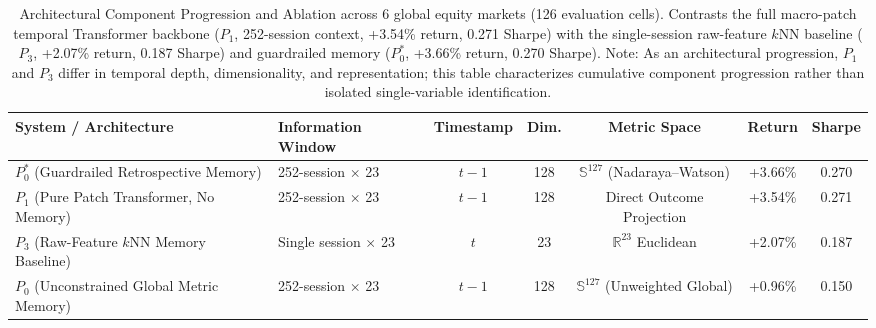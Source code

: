 \begin{table}[ht]
\centering
\small
\begin{tabular}{llccccc}
\toprule
\textbf{System / Architecture} & \textbf{Information Window} & \textbf{Timestamp} & \textbf{Dim.} & \textbf{Metric Space} & \textbf{Return} & \textbf{Sharpe} \\
\midrule
$P_0^*$ (Guardrailed Retrospective Memory) & 252-session $\times$ 23 & $t-1$ & 128 & $\mathbb{S}^{127}$ (Nadaraya--Watson) & +3.66\% & 0.270 \\
$P_1$ (Pure Patch Transformer, No Memory) & 252-session $\times$ 23 & $t-1$ & 128 & Direct Outcome Projection & +3.54\% & 0.271 \\
$P_3$ (Raw-Feature $k$NN Memory Baseline) & Single session $\times$ 23 & $t$ & 23 & $\mathbb{R}^{23}$ Euclidean & +2.07\% & 0.187 \\
$P_0$ (Unconstrained Global Metric Memory) & 252-session $\times$ 23 & $t-1$ & 128 & $\mathbb{S}^{127}$ (Unweighted Global) & +0.96\% & 0.150 \\
\bottomrule
\end{tabular}
\caption{Architectural Component Progression and Ablation across 6 global equity markets (126 evaluation cells). Contrasts the full macro-patch temporal Transformer backbone ($P_1$, 252-session context, +3.54\% return, 0.271 Sharpe) with the single-session raw-feature $k$NN baseline ($P_3$, +2.07\% return, 0.187 Sharpe) and guardrailed memory ($P_0^*$, +3.66\% return, 0.270 Sharpe). Note: As an architectural progression, $P_1$ and $P_3$ differ in temporal depth, dimensionality, and representation; this table characterizes cumulative component progression rather than isolated single-variable identification.}
\label{tab:p0_vs_p3_clean_ablation}
\end{table}
